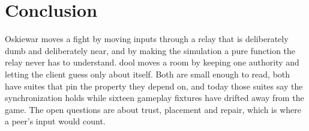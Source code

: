 \documentclass[10pt,letterpaper,twocolumn]{article}
\begin{document}
\section{Conclusion}\label{sec:conclusion}
Oskiewar moves a fight by moving inputs through a relay that is deliberately dumb and deliberately near, and by making the simulation a pure function the relay never has to understand. dool moves a room by keeping one authority and letting the client guess only about itself. Both are small enough to read, both have suites that pin the property they depend on, and today those suites say the synchronization holds while sixteen gameplay fixtures have drifted away from the game. The open questions are about trust, placement and repair, which is where a peer's input would count.

\balance


\end{document}
